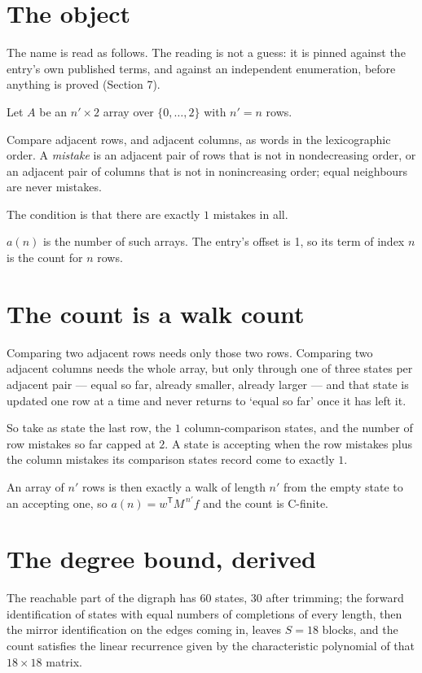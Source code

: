 \documentclass[11pt]{article}
\theoremstyle{definition}
\begin{document}
\section{The object}

The name is read as follows. The reading is not a guess: it is pinned against the entry's own published terms, and against an independent enumeration, before anything is proved (Section 7).

Let $A$ be an $n' \times 2$ array over $\{0,\dots,2\}$ with $n' = n$ rows.

Compare adjacent rows, and adjacent columns, as words in the lexicographic order. A {\itshape mistake} is an adjacent pair of rows that is not in nondecreasing order, or an adjacent pair of columns that is not in nonincreasing order; equal neighbours are never mistakes.

The condition is that there are exactly $1$ mistakes in all.

$a(n)$ is the number of such arrays. The entry's offset is 1, so its term of index $n$ is the count for $n$ rows.

\section{The count is a walk count}

Comparing two adjacent rows needs only those two rows. Comparing two adjacent columns needs the whole array, but only through one of three states per adjacent pair --- equal so far, already smaller, already larger --- and that state is updated one row at a time and never returns to `equal so far' once it has left it.

So take as state the last row, the $1$ column-comparison states, and the number of row mistakes so far capped at $2$. A state is accepting when the row mistakes plus the column mistakes its comparison states record come to exactly $1$.

An array of $n'$ rows is then exactly a walk of length $n'$ from the empty state to an accepting one, so $a(n) = w^{\mathsf T}M^{\,n'}f$ and the count is C-finite.

\section{The degree bound, derived}

The reachable part of the digraph has $60$ states, $30$ after trimming; the forward identification of states with equal numbers of completions of every length, then the mirror identification on the edges coming in, leaves $S = 18$ blocks, and the count satisfies the linear recurrence given by the characteristic polynomial of that $18\times18$ matrix.
\end{document}
